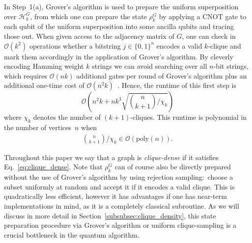 \documentclass[a4paper, onecolumn, accepted=2022-08-28]{quantumarticle}
\newcommand{\bigO}[1]{\mathcal{O}\left( #1 \right)}
\begin{document}
In Step~1(a), Grover's algorithm is used to prepare the uniform superposition over $\mathcal{H}_k^G$, from which one can prepare the state $\rho_k^G$ by applying a CNOT gate to each qubit of the uniform superposition into some ancilla qubits and tracing those out.
When given access to the adjacency matrix of $G$, one can check in $\bigO{k^2}$ operations whether a bitstring $j \in \{0, 1\}^n$ encodes a valid $k$-clique and mark them accordingly in the application of Grover's algorithm.
By cleverly encoding Hamming weight $k$ strings we can avoid searching over all $n$-bit strings, which requires $\bigO{nk}$ additional gates per round of Grover's algorithm plus an additional one-time cost of $\bigO{n^2k}$~\cite{gunn:review}.
Hence, the runtime of this first step is 
\[
\bigO{n^2k + nk^3\sqrt{\binom{n}{k+1}/\chi_k}} %
\]
where $\chi_k$ denotes the number of $(k+1)$-cliques. 
This runtime is polynomial in the number of vertices~$n$ when
\begin{align}
    \binom{n}{k+1}/\chi_k\in\bigO{\mathrm{poly}(n)}.
    \label{eq:clique_dense}
\end{align}

Throughout this paper we say that a graph is \emph{clique-dense} if it satisfies Eq.~\eqref{eq:clique_dense}.
Note that $\rho^G_k$ can of course also be directly prepared without the use of Grover's algorithm by using rejection sampling:\ choose a subset uniformly at random and accept it if it encodes a valid clique.
This is quadratically less efficient, however it has advantages if one has near-term implementations in mind, as it is a completely classical subroutine.
As we will discuss in more detail in Section~\ref{subsubsec:clique_density}, this state preparation procedure via Grover's algorithm or uniform clique-sampling is a crucial bottleneck in the quantum algorithm.
\end{document}
